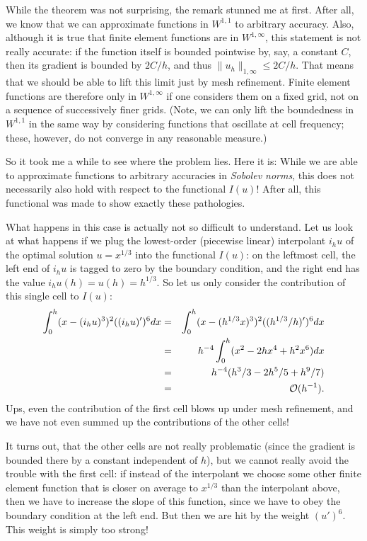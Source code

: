 \documentclass{article}
\begin{document}
While the theorem was not surprising, the remark stunned me at first. After
all, we know that we can approximate functions in $W^{1,1}$ to arbitrary
accuracy.  Also, although it is true that finite element functions are in
$W^{1,\infty}$, this statement is not really accurate: if the function itself
is bounded pointwise by, say, a constant $C$, then its gradient is bounded by
$2C/h$, and thus $\|u_h\|_{1,\infty} \le 2C/h$. That means that we should be
able to lift this limit just by mesh refinement. Finite element functions are
therefore only in $W^{1,\infty}$ if one considers them on a fixed grid, not on
a sequence of successively finer grids. (Note, we can only lift the
boundedness in $W^{1,1}$ in the same way by considering functions that
oscillate at cell frequency; these, however, do not converge in any reasonable
measure.)

So it took me a while to see where the problem lies. Here it is: While we are
able to approximate functions to arbitrary accuracies in \textit{Sobolev
  norms}, this does not necessarily also hold with respect to the functional
$I(u)$!  After all, this functional was made to show exactly these
pathologies.

What happens in this case is actually not so difficult to understand. Let us
look at what happens if we plug the lowest-order (piecewise linear)
interpolant $i_hu$ of the optimal solution $u=x^{1/3}$ into the functional
$I(u)$: on the leftmost cell, the left end of $i_hu$ is tagged to zero by the
boundary condition, and the right end has the value $i_hu(h)=u(h)=h^{1/3}$. So
let us only consider the contribution of this single cell to $I(u)$:
\begin{eqnarray*}
  \int_0^h (x-(i_hu)^3)^2 ((i_hu)')^6 dx
  &=&
  \int_0^h (x-(h^{1/3}x)^3)^2 ((h^{1/3}/h)')^6 dx
  \\
  &=&
  h^{-4} \int_0^h (x^2-2hx^4+h^2x^6) dx
  \\
  &=&
  h^{-4} (h^3/3-2h^5/5+h^9/7)
  \\
  &=& {\cal O}(h^{-1}).
\end{eqnarray*}
Ups, even the contribution of the first cell blows up under mesh refinement,
and we have not even summed up the contributions of the other cells!

It turns out, that the other cells are not really problematic (since the
gradient is bounded there by a constant independent of $h$), but we cannot
really avoid the trouble with the first cell: if instead of the interpolant we
choose some other finite element function that is closer on average to
$x^{1/3}$ than the interpolant above, then we have to increase the slope of
this function, since we have to obey the boundary condition at the left
end. But then we are hit by the weight $(u')^6$. This weight is simply too
strong! 
\end{document}
